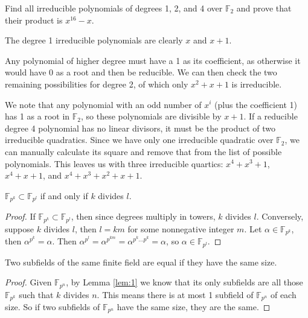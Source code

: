 \documentclass[10pt]{report}
\begin{document}

\begin{exer}[DF 13.5: 2]
Find all irreducible polynomials of degrees 1, 2, and 4 over $\mathbb{F}_{2}$ and prove that their product is $x^{16}-x$.
\end{exer}
The degree 1 irreducible polynomials are clearly {\color{blue}$x$} and {\color{blue}$x+1$}.

Any polynomial of higher degree must have a 1 as its coefficient, as otherwise it would have 0 as a root and then be reducible. We can then check the two remaining possibilities for degree 2, of which only {\color{blue}$x^2 + x+ 1$} is irreducible.

We note that any polynomial with an odd number of $x^i$ (plus the coefficient 1) has 1 as a root in $\mathbb{F}_2$, so these polynomials are divisible by $x+1$. If a reducible degree 4 polynomial has no linear divisors, it must be the product of two irreducible quadratics. Since we have only one irreducible quadratic over $\mathbb{F}_2$, we can manually calculate its square and remove that from the list of possible polynomials. This leaves us with three irreducible quartics: {\color{blue}$x^4+x^3+1$}, {\color{blue}$x^4+x+1$}, and {\color{blue}$x^4+x^3+x^2+x+1$}.

\begin{lem}
	\label{lem:1}
	$\mathbb{F}_{p^k} \subset \mathbb{F}_{p^l}$ if and only if $k$ divides $l$.
\end{lem}
\begin{proof}
	If $\mathbb{F}_{p^k}\subset \mathbb{F}_{p^l}$, then since degrees multiply in towers, $k$ divides $l$. Conversely, suppose $k$ divides $l$, then $l=km$ for some nonnegative integer $m$. Let $\alpha \in \mathbb{F}_{p^k}$, then $\alpha^{p^k}=\alpha$. Then $\alpha^{p^l}=\alpha^{p^{km}}=\alpha^{p^k \dots p^k}=\alpha$, so $\alpha \in \mathbb{F}_{p^l}$.
\end{proof}

\begin{lem}
	\label{lem:2}
	Two subfields of the same finite field are equal if they have the same size.
\end{lem}
\begin{proof}
	Given $\mathbb{F}_{p^n}$, by Lemma \ref{lem:1} we know that its only subfields are all those $\mathbb{F}_{p^k}$ such that $k$ divides $n$. This means there is at most 1 subfield of $\mathbb{F}_{p^n}$ of each size. So if two subfields of $\mathbb{F}_{p^n}$ have the same size, they are the same.
\end{proof}
\end{document}
